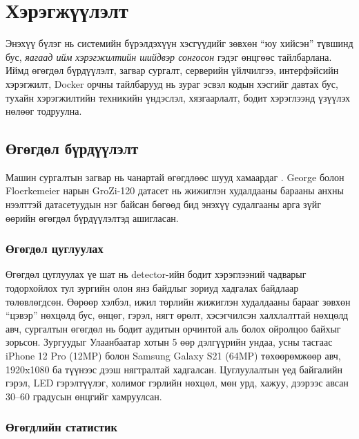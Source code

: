 \chapter{Хэрэгжүүлэлт}

Энэхүү бүлэг нь системийн бүрэлдэхүүн хэсгүүдийг зөвхөн ``юу хийсэн'' түвшинд бус, \textit{яагаад ийм хэрэгжилтийн шийдвэр сонгосон} гэдэг өнцгөөс тайлбарлана. Иймд өгөгдөл бүрдүүлэлт, загвар сургалт, серверийн үйлчилгээ, интерфэйсийн хэрэгжилт, Docker орчны тайлбарууд нь зураг эсвэл кодын хэсгийг давтах бус, тухайн хэрэгжилтийн техникийн үндэслэл, хязгаарлалт, бодит хэрэглээнд үзүүлэх нөлөөг тодруулна.

\section{Өгөгдөл бүрдүүлэлт}

Машин сургалтын загвар нь чанартай өгөгдлөөс шууд хамаардаг \cite{data_augmentation}. George болон Floerkemeier нарын GroZi-120 датасет \cite{grozi_dataset} нь жижиглэн худалдааны барааны анхны нээлттэй датасетуудын нэг байсан бөгөөд бид энэхүү судалгааны арга зүйг өөрийн өгөгдөл бүрдүүлэлтэд ашигласан.

\subsection{Өгөгдөл цуглуулах}

Өгөгдөл цуглуулах үе шат нь detector-ийн бодит хэрэглээний чадварыг тодорхойлох тул зургийн олон янз байдлыг зориуд хадгалах байдлаар төлөвлөгдсөн. Өөрөөр хэлбэл, ижил төрлийн жижиглэн худалдааны барааг зөвхөн ``цэвэр'' нөхцөлд бус, өнцөг, гэрэл, нягт өрөлт, хэсэгчилсэн халхлалттай нөхцөлд авч, сургалтын өгөгдөл нь бодит аудитын орчинтой аль болох ойролцоо байхыг зорьсон. Зургуудыг Улаанбаатар хотын 5 өөр дэлгүүрийн ундаа, усны тасгаас iPhone 12 Pro (12MP) болон Samsung Galaxy S21 (64MP) төхөөрөмжөөр авч, 1920x1080 ба түүнээс дээш нягтралтай хадгалсан. Цуглуулалтын үед байгалийн гэрэл, LED гэрэлтүүлэг, холимог гэрлийн нөхцөл, мөн урд, хажуу, дээрээс авсан 30--60 градусын өнцгийг хамруулсан.

\subsection{Өгөгдлийн статистик}

